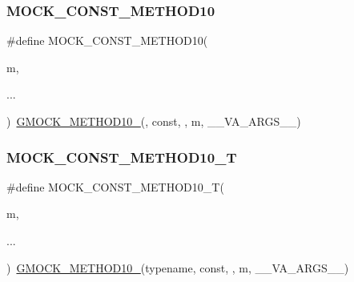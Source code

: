 \mbox{\label{googletest-master_2googlemock_2include_2gmock_2gmock-generated-function-mockers_8h_a4f16ede0ef660fb6dc49e5f5d226fbf9}} 
\subsubsection{\texorpdfstring{MOCK\_CONST\_METHOD10}{MOCK\_CONST\_METHOD10}}
{\footnotesize\ttfamily \#define M\+O\+C\+K\+\_\+\+C\+O\+N\+S\+T\+\_\+\+M\+E\+T\+H\+O\+D10(\begin{DoxyParamCaption}\item[{}]{m,  }\item[{}]{... }\end{DoxyParamCaption})~\mbox{\hyperlink{_obj__test_2lib_2googletest-release-1_88_81_2googlemock_2include_2gmock_2gmock-generated-function-mockers_8h_a81a48223a8771de36ef92ac6d56f6e81}{G\+M\+O\+C\+K\+\_\+\+M\+E\+T\+H\+O\+D10\+\_\+}}(, const, , m, \+\_\+\+\_\+\+V\+A\+\_\+\+A\+R\+G\+S\+\_\+\+\_\+)}

\mbox{\label{googletest-master_2googlemock_2include_2gmock_2gmock-generated-function-mockers_8h_aa31d758cb898bad2d16ac706c204da7f}} 
\subsubsection{\texorpdfstring{MOCK\_CONST\_METHOD10\_T}{MOCK\_CONST\_METHOD10\_T}}
{\footnotesize\ttfamily \#define M\+O\+C\+K\+\_\+\+C\+O\+N\+S\+T\+\_\+\+M\+E\+T\+H\+O\+D10\+\_\+T(\begin{DoxyParamCaption}\item[{}]{m,  }\item[{}]{... }\end{DoxyParamCaption})~\mbox{\hyperlink{_obj__test_2lib_2googletest-release-1_88_81_2googlemock_2include_2gmock_2gmock-generated-function-mockers_8h_a81a48223a8771de36ef92ac6d56f6e81}{G\+M\+O\+C\+K\+\_\+\+M\+E\+T\+H\+O\+D10\+\_\+}}(typename, const, , m, \+\_\+\+\_\+\+V\+A\+\_\+\+A\+R\+G\+S\+\_\+\+\_\+)}

